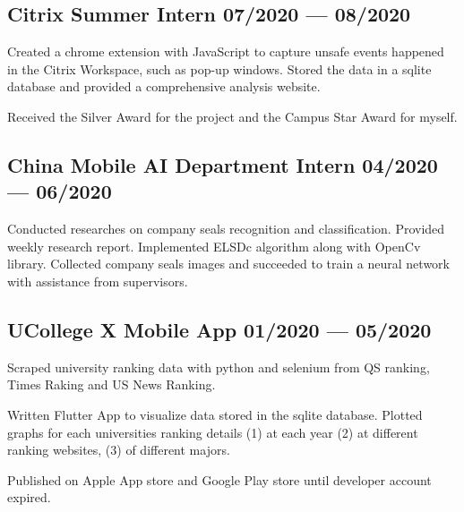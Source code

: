 \subsection{{
    Citrix Summer Intern
    \hfill 07/2020 --- 08/2020
}}
\begin{zitemize}
    \item   Created a chrome extension with JavaScript to capture unsafe events
            happened in the Citrix Workspace, such as pop-up windows. 
            Stored the data in a sqlite database and provided a comprehensive
            analysis website.
    \item   Received the Silver Award for the project and the Campus Star Award for myself.
\end{zitemize}


\subsection{{
    China Mobile AI Department Intern
    \hfill 04/2020 --- 06/2020
}}
\begin{zitemize}
    \item   Conducted researches on company seals recognition and classification.
            Provided weekly research report.
            Implemented ELSDc algorithm along with OpenCv library. 
            Collected company seals images and succeeded to train a neural network with assistance from supervisors.
\end{zitemize}


\subsection{{
    UCollege X Mobile App
    \hfill 01/2020 --- 05/2020
}}
\begin{zitemize}
    \item   Scraped university ranking data with python and selenium from QS ranking,
            Times Raking and US News Ranking.
    \item   Written Flutter App to visualize data stored in the sqlite database.
            Plotted graphs for each universities ranking details (1) at each year
            (2) at different ranking websites, (3) of different majors.
    \item   Published on Apple App store and Google Play store until developer account expired.
\end{zitemize}
